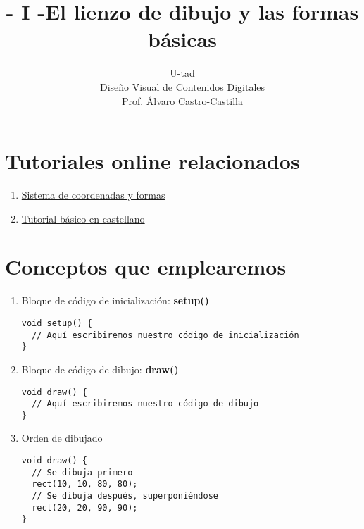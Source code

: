 \documentclass[a4paper,oneside]{article}
\title{- I -\linebreak El lienzo de dibujo y las formas básicas}
\author{U-tad\\ Diseño Visual de Contenidos Digitales\\ Prof. Álvaro Castro-Castilla}
\date{}
\begin{document}
\maketitle


\section{Tutoriales online relacionados}
\begin{enumerate}
  \item \href{http://processing.org/learning/drawing/}{Sistema de coordenadas y formas} 
  \item \href{http://go.yuri.at/p5/tutorial/}{Tutorial básico en castellano}
\end{enumerate}


\section{Conceptos que emplearemos}
\begin{enumerate}
  \item Bloque de código de inicialización: \textbf{setup()}

    \begin{verbatim}
void setup() {
  // Aquí escribiremos nuestro código de inicialización
}
    \end{verbatim}
  \item Bloque de código de dibujo: \textbf{draw()}

    \begin{verbatim}
void draw() {
  // Aquí escribiremos nuestro código de dibujo
}
    \end{verbatim}
  \item Orden de dibujado

    \begin{verbatim}
void draw() {
  // Se dibuja primero
  rect(10, 10, 80, 80);
  // Se dibuja después, superponiéndose
  rect(20, 20, 90, 90);
}
    \end{verbatim}
\end{enumerate}
\end{document}
